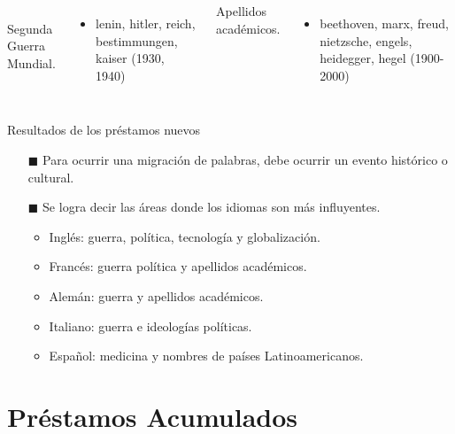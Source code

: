\documentclass[10pt,xcolor={usenames,dvipsnames}]{beamer}
\begin{document}
\begin{frame}
{\begin{columns}
			\\
			\textcolor{Sepia}{Segunda Guerra Mundial.}
			\begin{itemize}
				\item lenin, hitler, reich, bestimmungen, kaiser (1930, 1940)  
			\end{itemize} 
			
			\textcolor{Sepia}{Apellidos académicos.}
			\begin{itemize}
				\item beethoven, marx, freud, nietzsche,  engels, heidegger, hegel (1900-2000)
			\end{itemize}
			
		\end{columns}
	}	
	
\end{frame}

\begin{frame}[fragile]{Resultados de los préstamos nuevos}
	\begin{itemize}
		\item [$\blacksquare$] Para ocurrir una migración de palabras, debe ocurrir un evento histórico o cultural.\\
		
		\item [$\blacksquare$] Se logra decir las áreas donde los idiomas son más influyentes.
		\begin{itemize}
			\item Inglés: guerra, política, tecnología y globalización.
			\item Francés: guerra política y apellidos académicos.
			\item Alemán: guerra y apellidos académicos.
			\item Italiano: guerra e ideologías políticas.
			\item Español: medicina y nombres de países Latinoamericanos. 
		\end{itemize}
	\end{itemize}
\end{frame}


\section{Préstamos Acumulados}
\end{document}
